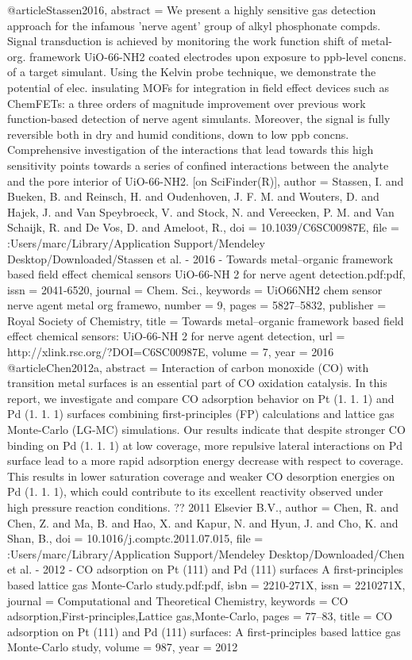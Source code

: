 @article{Stassen2016,
abstract = {We present a highly sensitive gas detection approach for the infamous 'nerve agent' group of alkyl phosphonate compds. Signal transduction is achieved by monitoring the work function shift of metal-org. framework UiO-66-NH2 coated electrodes upon exposure to ppb-level concns. of a target simulant. Using the Kelvin probe technique, we demonstrate the potential of elec. insulating MOFs for integration in field effect devices such as ChemFETs: a three orders of magnitude improvement over previous work function-based detection of nerve agent simulants. Moreover, the signal is fully reversible both in dry and humid conditions, down to low ppb concns. Comprehensive investigation of the interactions that lead towards this high sensitivity points towards a series of confined interactions between the analyte and the pore interior of UiO-66-NH2. [on SciFinder(R)]},
author = {Stassen, I. and Bueken, B. and Reinsch, H. and Oudenhoven, J. F. M. and Wouters, D. and Hajek, J. and {Van Speybroeck}, V. and Stock, N. and Vereecken, P. M. and {Van Schaijk}, R. and {De Vos}, D. and Ameloot, R.},
doi = {10.1039/C6SC00987E},
file = {:Users/marc/Library/Application Support/Mendeley Desktop/Downloaded/Stassen et al. - 2016 - Towards metal–organic framework based field effect chemical sensors UiO-66-NH 2 for nerve agent detection.pdf:pdf},
issn = {2041-6520},
journal = {Chem. Sci.},
keywords = {UiO66NH2 chem sensor nerve agent metal org framewo},
number = {9},
pages = {5827--5832},
publisher = {Royal Society of Chemistry},
title = {{Towards metal–organic framework based field effect chemical sensors: UiO-66-NH 2 for nerve agent detection}},
url = {http://xlink.rsc.org/?DOI=C6SC00987E},
volume = {7},
year = {2016}
}
@article{Chen2012a,
abstract = {Interaction of carbon monoxide (CO) with transition metal surfaces is an essential part of CO oxidation catalysis. In this report, we investigate and compare CO adsorption behavior on Pt (1. 1. 1) and Pd (1. 1. 1) surfaces combining first-principles (FP) calculations and lattice gas Monte-Carlo (LG-MC) simulations. Our results indicate that despite stronger CO binding on Pd (1. 1. 1) at low coverage, more repulsive lateral interactions on Pd surface lead to a more rapid adsorption energy decrease with respect to coverage. This results in lower saturation coverage and weaker CO desorption energies on Pd (1. 1. 1), which could contribute to its excellent reactivity observed under high pressure reaction conditions. ?? 2011 Elsevier B.V.},
author = {Chen, R. and Chen, Z. and Ma, B. and Hao, X. and Kapur, N. and Hyun, J. and Cho, K. and Shan, B.},
doi = {10.1016/j.comptc.2011.07.015},
file = {:Users/marc/Library/Application Support/Mendeley Desktop/Downloaded/Chen et al. - 2012 - CO adsorption on Pt (111) and Pd (111) surfaces A first-principles based lattice gas Monte-Carlo study.pdf:pdf},
isbn = {2210-271X},
issn = {2210271X},
journal = {Computational and Theoretical Chemistry},
keywords = {CO adsorption,First-principles,Lattice gas,Monte-Carlo},
pages = {77--83},
title = {{CO adsorption on Pt (111) and Pd (111) surfaces: A first-principles based lattice gas Monte-Carlo study}},
volume = {987},
year = {2012}
}

